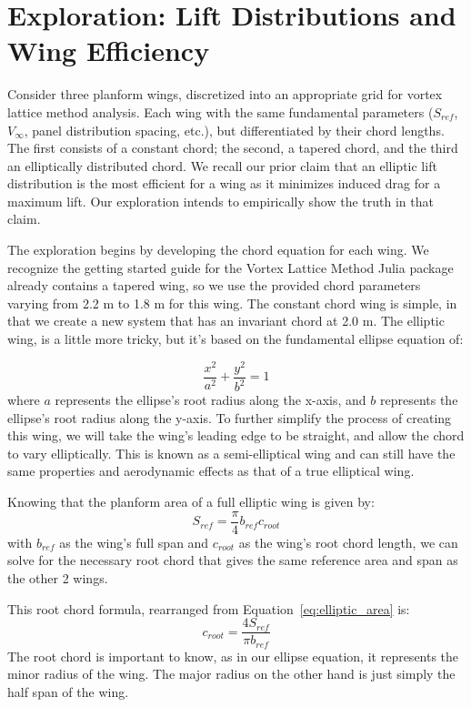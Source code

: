 \documentclass{article}
\begin{document}
\section{Exploration: Lift Distributions and Wing Efficiency}
Consider three planform wings, discretized into an appropriate grid for vortex lattice method analysis. Each wing with the same fundamental parameters ($S_{ref}$, $V_{\infty}$, panel distribution spacing, etc.), but differentiated by their chord lengths. The first
consists of a constant chord; the second, a tapered chord, and the third an elliptically distributed chord. We recall our prior claim that an elliptic lift distribution is the most efficient for a wing as it minimizes induced drag for a maximum lift. Our exploration intends
to empirically show the truth in that claim. 

The exploration begins by developing the chord equation for each wing. We recognize the getting started guide for the Vortex Lattice Method Julia package already contains a tapered wing, so we use the provided chord parameters varying from 2.2 m to 1.8 m for this wing.
The constant chord wing is simple, in that we create a new system that has an invariant chord at 2.0 m. 
The elliptic wing, is a little more tricky, but it's based on the fundamental ellipse equation of:

\begin{equation}\label{eq:ellipse}
\frac{x^2}{a^2} + \frac{y^2}{b^2} = 1
\end{equation}
where $a$ represents the ellipse's root radius along the x-axis, and $b$ represents the ellipse's root radius along the y-axis. To further simplify the process of creating this wing, we will take the wing's leading edge to be straight, and allow the chord to vary elliptically. This is known as a semi-elliptical wing and can still have the same properties and aerodynamic effects as that of a true elliptical wing.

Knowing that the planform area of a full elliptic wing is given by:
\begin{equation}\label{eq:elliptic_area}
S_{ref} = \frac{\pi}{4} b_{ref}  c_{root}
\end{equation}
with $b_{ref}$ as the wing's full span and $c_{root}$ as the wing's root chord length, we can solve for the necessary root chord that gives the same reference area and span as the other 2 wings.

This root chord formula, rearranged from Equation~\ref{eq:elliptic_area} is:
\begin{equation}\label{c_root}
c_{root} = \frac{4  S_{ref}}{\pi  b_{ref}}
\end{equation}
The root chord is important to know, as in our ellipse equation, it represents the minor radius of the wing. The major radius on the other hand is just simply the half span of the wing.
\end{document}
